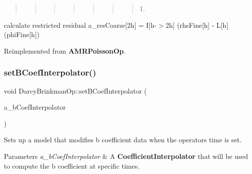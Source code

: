 \begin{quote}
\begin{quote}
\begin{quote}
\begin{quote}
\begin{quote}
\begin{quote}
\begin{quote}
1. \end{quote}
\end{quote}
\end{quote}
\end{quote}
\end{quote}
\end{quote}
\end{quote}
calculate restricted residual a\+\_\+res\+Coarse\mbox{[}2h\mbox{]} = I\mbox{[}h-\/$>$2h\mbox{]} (rhs\+Fine\mbox{[}h\mbox{]} -\/ L\mbox{[}h\mbox{]}(phi\+Fine\mbox{[}h\mbox{]}) 

Reimplemented from \textbf{ A\+M\+R\+Poisson\+Op}.

\mbox{\label{class_darcy_brinkman_op_a291dd090a4475bcb95fe2901722660c9}} 
\subsubsection{\texorpdfstring{set\+B\+Coef\+Interpolator()}{setBCoefInterpolator()}}
{\footnotesize\ttfamily void Darcy\+Brinkman\+Op\+::set\+B\+Coef\+Interpolator (\begin{DoxyParamCaption}\item[{\textbf{ Ref\+Counted\+Ptr}$<$ \textbf{ Coefficient\+Interpolator}$<$ \textbf{ Level\+Data}$<$ \textbf{ Flux\+Box} $>$, \textbf{ Level\+Data}$<$ \textbf{ F\+Array\+Box} $>$ $>$ $>$ \&}]{a\+\_\+b\+Coef\+Interpolator }\end{DoxyParamCaption})\hspace{0.3cm}{\ttfamily [inline]}}

Sets up a model that modifies b coefficient data when the operator\textquotesingle{}s time is set. 
\begin{DoxyParams}{Parameters}
{\em a\+\_\+b\+Coef\+Interpolator} & A \textbf{ Coefficient\+Interpolator} that will be used to compute the b coefficient at specific times. \\
\hline
\end{DoxyParams}
\mbox{\label{class_darcy_brinkman_op_a50dc1353f78c310c788763b122ca939d}} 
